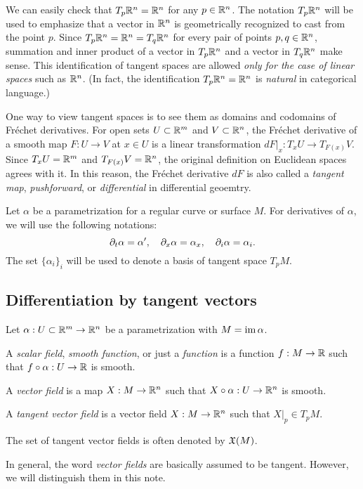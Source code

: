 \documentclass{../../large}
\def\a{\alpha}
\begin{document}
\begin{rmk}
We can easily check that $T_p\mathbb{R}^n=\mathbb{R}^n$ for any $p\in\mathbb{R}^n$.
The notation $T_p\mathbb{R}^n$ will be used to emphasize that a vector in $\mathbb{R}^n$ is geometrically recognized to cast from the point $p$.
Since $T_p\mathbb{R}^n=\mathbb{R}^n=T_q\mathbb{R}^n$ for every pair of points $p,q\in\mathbb{R}^n$, summation and inner product of a vector in $T_p\mathbb{R}^n$ and a vector in $T_q\mathbb{R}^n$ make sense.
This identification of tangent spaces are allowed \emph{only for the case of linear spaces} such as $\mathbb{R}^n$.
(In fact, the identification $T_p\mathbb{R}^n=\mathbb{R}^n$ is \emph{natural} in categorical language.)
\end{rmk}
\begin{rmk}
One way to view tangent spaces is to see them as domains and codomains of Fr\'echet derivatives.
For open sets $U\subset\mathbb{R}^m$ and $V\subset\mathbb{R}^n$, the Fr\'echet derivative of a smooth map $F:U\to V$ at $x\in U$ is a linear transformation $dF|_x:T_xU\to T_{F(x)}V$.
Since $T_xU=\mathbb{R}^m$ and $T_{F(x)}V=\mathbb{R}^n$, the original definition on Euclidean spaces agrees with it.
In this reason, the Fr\'echet derivative $dF$ is also called a \emph{tangent map}, \emph{pushforward}, or \emph{differential} in differential geoemtry.
\end{rmk}


\begin{notn*}
Let $\a$ be a parametrization for a regular curve or surface $M$.
For derivatives of $\a$, we will use the following notations:
\[\pd_t\a=\a',\quad\pd_x\a=\a_x,\quad\pd_i\a=\a_i.\]
The set $\{\a_i\}_i$ will be used to denote a basis of tangent space $T_pM$.
\end{notn*}





\subsection{Differentiation by tangent vectors}


\begin{defn}
Let $\a:U\subset\R^m\to\R^n$ be a parametrization with $M=\im\a$.
\begin{parts}
\item A \emph{scalar field}, \emph{smooth function}, or just a \emph{function} is a function $f:M\to\mathbb{R}$ such that $f\circ\a:U\to\R$ is smooth.
\item A \emph{vector field} is a map $X:M\to\mathbb{R}^n$ such that $X\circ\a:U\to\R^n$ is smooth.
\item A \emph{tangent vector field} is a vector field $X:M\to\mathbb{R}^n$ such that $X|_p\in T_pM$.
\end{parts}
The set of tangent vector fields is often denoted by $\mathfrak{X}(M)$.
\end{defn}
\begin{rmk}
In general, the word \emph{vector fields} are basically assumed to be tangent.
However, we will distinguish them in this note.
\end{rmk}
\end{document}
